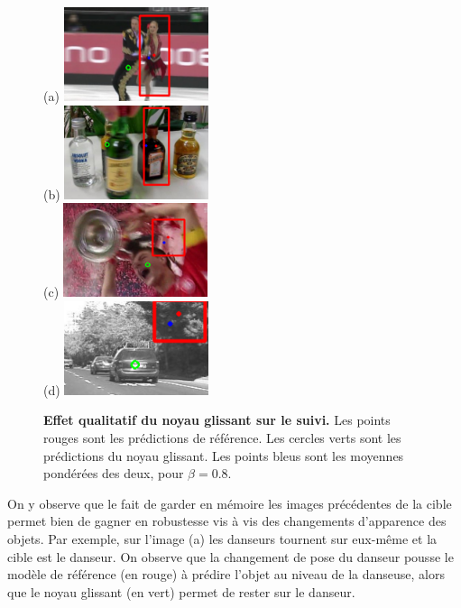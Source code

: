 \documentclass[10pt,twocolumn,letterpaper,french]{article}
\begin{document}
\begin{figure}[!h]
  \centering
  (a)
  \includegraphics[width=120pt]{images/gamma/000469.png}\\
  (b)
  \includegraphics[width=120pt]{images/gamma/000726.png}\\
  (c)
  \includegraphics[width=120pt]{images/gamma/000038.png}\\
  (d)
  \includegraphics[width=120pt]{images/gamma/000414.png}\\
  \caption{\textbf{Effet qualitatif du noyau glissant sur le suivi.} Les points rouges sont les prédictions de référence. Les cercles verts sont les prédictions du noyau glissant. Les points bleus sont les moyennes pondérées des deux, pour $\beta=0.8$.}
  \label{exemples_predictions}
  \end{figure}

On y observe que le fait de garder en mémoire les images précédentes de la cible permet bien de gagner en robustesse vis à vis des changements d'apparence des objets. Par exemple, sur l'image (a) les danseurs tournent sur eux-même et la cible est le danseur. On observe que la changement de pose du danseur pousse le modèle de référence (en rouge) à prédire l'objet au niveau de la danseuse, alors que le noyau glissant (en vert) permet de rester sur le danseur.
\end{document}
